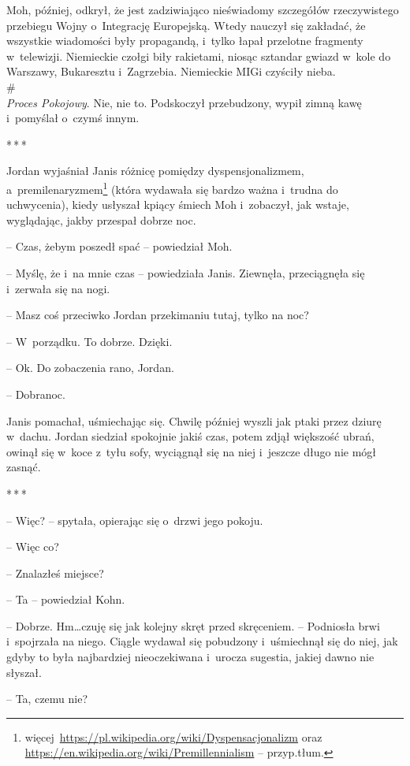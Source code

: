 \documentclass[oneside,polish,11pt,sfheadings]{mwbk}
\newcommand{\threeast}{\bigskip\par\centerline{*\,*\,*}\medskip\par}%
\begin{document}
Moh, później, odkrył, że jest zadziwiająco nieświadomy szczegółów
rzeczywistego przebiegu Wojny o~Integrację Europejską. Wtedy nauczył się
zakładać, że wszystkie wiadomości były propagandą, i~tylko łapał
przelotne fragmenty w~telewizji. Niemieckie czołgi biły rakietami,
niosąc sztandar gwiazd w~kole do Warszawy, Bukaresztu i~Zagrzebia.
Niemieckie MIGi czyściły nieba.\\

\#\\

\emph{Proces Pokojowy}. Nie, nie to. Podskoczył przebudzony, wypił zimną
kawę i~pomyślał o~czymś innym.

\threeast

Jordan wyjaśniał Janis różnicę pomiędzy dyspensjonalizmem, a~premilenaryzmem\footnote{
więcej~\url{https://pl.wikipedia.org/wiki/Dyspensacjonalizm}
oraz \url{https://en.wikipedia.org/wiki/Premillennialism} -- przyp.tłum.} (która wydawała się bardzo ważna i~trudna do
uchwycenia), kiedy usłyszał kpiący śmiech Moh i~zobaczył, jak wstaje,
wyglądając, jakby przespał dobrze noc. 

-- Czas, żebym poszedł spać -- powiedział Moh.

-- Myślę, że i~na mnie czas -- powiedziała Janis. Ziewnęła, przeciągnęła
się i~zerwała się na nogi.

-- Masz coś przeciwko Jordan przekimaniu tutaj, tylko na noc?

-- W~porządku. To dobrze. Dzięki.

-- Ok. Do zobaczenia rano, Jordan.

-- Dobranoc.

Janis pomachał, uśmiechając się. Chwilę później wyszli jak ptaki przez
dziurę w~dachu. Jordan siedział spokojnie jakiś czas, potem zdjął
większość ubrań, owinął się w~koce z~tyłu sofy, wyciągnął się na niej i~jeszcze długo nie mógł zasnąć.
  \threeast 

-- Więc? -- spytała, opierając się o~drzwi jego pokoju.

-- Więc co?

-- Znalazłeś miejsce?

-- Ta -- powiedział Kohn.

-- Dobrze. Hm\ldots czuję się jak kolejny skręt przed skręceniem. -- Podniosła brwi i~spojrzała na niego. Ciągle wydawał się pobudzony i~uśmiechnął się do niej, jak gdyby to była najbardziej nieoczekiwana i~urocza sugestia, jakiej dawno nie słyszał.

-- Ta, czemu nie?
\end{document}
